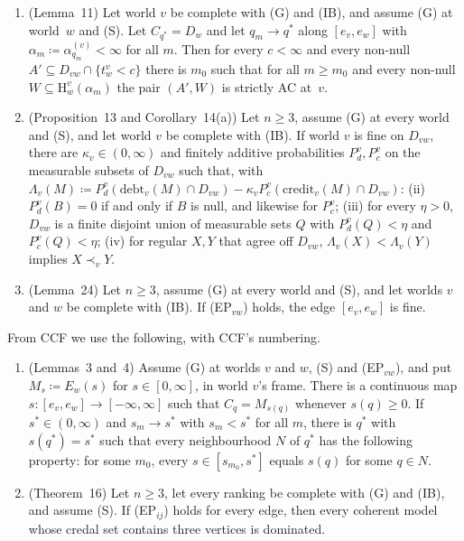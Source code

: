 \documentclass[11pt]{article}
\theoremstyle{definition}\newtheorem{definition}[theorem]{Definition}
\theoremstyle{remark}\newtheorem{remark}[theorem]{Remark}
\newcommand{\debt}{\mathrm{debt}}
\newcommand{\cred}{\mathrm{credit}}
\newcommand{\Hi}[3]{\mathrm H^{#1}_{#2}(#3)}
\begin{document}
\begin{enumerate}[label=(F\arabic*),leftmargin=*,itemsep=3pt]
[In FSE's notation, with $v=1$ and $j\coloneqq w$: Lemma~8(a) gives
$\mathrm B_w(b,\infty)\prec_dA_0\preceq_dA$, subsets of the tail are
$\preceq_d$ the tail by weak (G), and $Z\coloneqq Z_I(A)$; Lemma~8(b) gives
$\mathrm B_w(0,a)\preceq_cT$. Lemma~8 holds for \emph{every} $j\ge2$, so
the edge $[e_v,e_w]$ may be prescribed.]
\item\label{in:SAC} (Lemma~11) Let world $v$ be complete with (G) and (IB),
and assume (G) at world~$w$ and (S). Let $C_{q^*}=D_w$ and let $q_m\to
q^*$ along $[e_v,e_w]$ with $\alpha_m\coloneqq\alpha^{(v)}_{q_m}<\infty$
for all $m$. Then for every $c<\infty$ and every non-null
$A'\subseteq D_{vw}\cap\{t^v_w<c\}$ there is $m_0$ such that for all $m\ge
m_0$ and every non-null $W\subseteq\Hi vw{\alpha_m}$ the pair $(A',W)$ is
strictly AC at~$v$.
\item\label{in:ext} (Proposition~13 and Corollary~14(a)) Let $n\ge3$,
assume (G) at every world and (S), and let world $v$ be complete with (IB).
If world $v$ is fine on $D_{vw}$, there are $\kappa_v\in(0,\infty)$ and
finitely additive probabilities $P^v_d,P^v_c$ on the measurable subsets of
$D_{vw}$ such that, with
$\Lambda_v(M)\coloneqq P^v_d(\debt_v(M)\cap D_{vw})-\kappa_vP^v_c(\cred_v(M)
\cap D_{vw})$:
(ii) $P^v_d(B)=0$ if and only if $B$ is null, and likewise for $P^v_c$;
(iii) for every $\eta>0$, $D_{vw}$ is a finite disjoint union of
measurable sets $Q$ with $P^v_d(Q)<\eta$ and $P^v_c(Q)<\eta$;
(iv) for regular $X,Y$ that agree off $D_{vw}$,
$\Lambda_v(X)<\Lambda_v(Y)$ implies $X\prec_vY$.
\item\label{in:EPfine} (Lemma~24) Let $n\ge3$, assume (G) at every world
and (S), and let worlds $v$ and $w$ be complete with (IB). If (EP$_{vw}$)
holds, the edge $[e_v,e_w]$ is fine.
\end{enumerate}
From CCF we use the following, with CCF's numbering.
\begin{enumerate}[label=(C\arabic*),leftmargin=*,itemsep=3pt]
\item\label{in:edge} (Lemmas~3 and~4) Assume (G) at worlds $v$ and $w$,
(S) and (EP$_{vw}$), and put $M_s\coloneqq E_w(s)$ for $s\in[0,\infty]$,
in world $v$'s frame. There is a continuous map $s\colon[e_v,e_w]\to
[-\infty,\infty]$ such that $C_q=M_{s(q)}$ whenever $s(q)\ge0$. If $s^*\in
(0,\infty)$ and $s_m\to s^*$ with $s_m<s^*$ for all $m$, there is $q^*$
with $s(q^*)=s^*$ such that every neighbourhood $N$ of $q^*$ has the
following property: for some $m_0$, every $s\in[s_{m_0},s^*]$ equals
$s(q)$ for some $q\in N$.
\item\label{in:reduction} (Theorem~16) Let $n\ge3$, let every ranking be
complete with (G) and (IB), and assume (S). If (EP$_{ij}$) holds for every
edge, then every coherent model whose credal set contains three vertices
is dominated.
\end{enumerate}
\end{document}

